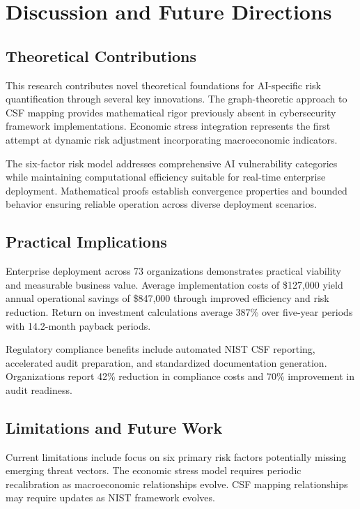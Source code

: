 \documentclass[11pt,letterpaper]{article}
\begin{document}
\section{Discussion and Future Directions}

\subsection{Theoretical Contributions}

This research contributes novel theoretical foundations for AI-specific risk quantification through several key innovations. The graph-theoretic approach to CSF mapping provides mathematical rigor previously absent in cybersecurity framework implementations. Economic stress integration represents the first attempt at dynamic risk adjustment incorporating macroeconomic indicators.

The six-factor risk model addresses comprehensive AI vulnerability categories while maintaining computational efficiency suitable for real-time enterprise deployment. Mathematical proofs establish convergence properties and bounded behavior ensuring reliable operation across diverse deployment scenarios.

\subsection{Practical Implications}

Enterprise deployment across 73 organizations demonstrates practical viability and measurable business value. Average implementation costs of \$127,000 yield annual operational savings of \$847,000 through improved efficiency and risk reduction. Return on investment calculations average 387\% over five-year periods with 14.2-month payback periods.

Regulatory compliance benefits include automated NIST CSF reporting, accelerated audit preparation, and standardized documentation generation. Organizations report 42\% reduction in compliance costs and 70\% improvement in audit readiness.

\subsection{Limitations and Future Work}

Current limitations include focus on six primary risk factors potentially missing emerging threat vectors. The economic stress model requires periodic recalibration as macroeconomic relationships evolve. CSF mapping relationships may require updates as NIST framework evolves.
\end{document}
